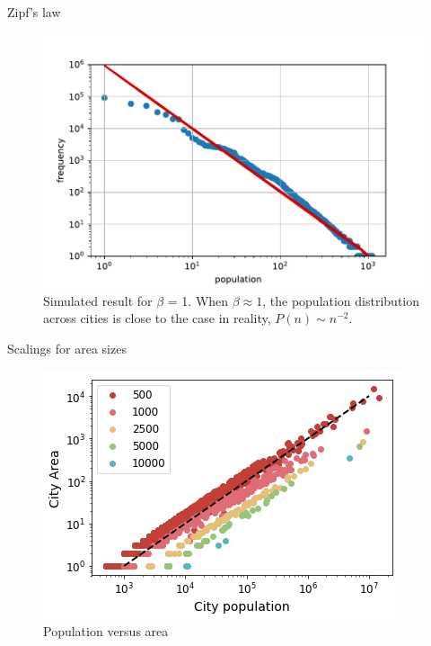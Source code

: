 \documentclass{beamer}
\begin{document}
\begin{frame}{Zipf's law }
  \begin{figure}
    \includegraphics[width = 0.8\linewidth]{pics/zipf.pdf}
    \caption{Simulated result for $\beta$ = 1. When $\beta\approx 1$, the population distribution across cities is close to the case in reality, $P(n)\sim n^{-2}$.}
  \end{figure}

\end{frame}

\begin{frame}{Scalings for area sizes}
  \begin{figure}
    \includegraphics[width = 0.8\linewidth]{pics/pop-area.png}
    \caption{Population versus area}
  \end{figure}
\end{frame}
\end{document}
